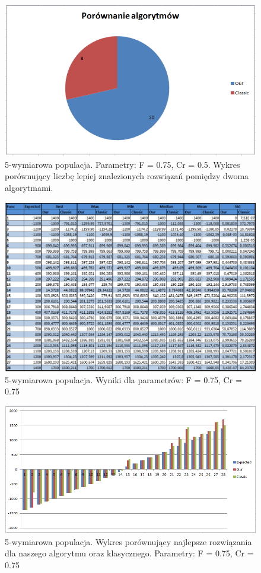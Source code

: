 \documentclass[a4paper]{article}
\begin{document}
\begin{figure}[!h]
\centering
\includegraphics[width=\textwidth]{F75Cr5L5statystyka.png}
\caption{5-wymiarowa populacja. Parametry: F = 0.75, Cr = 0.5. Wykres porównujący liczbę lepiej znalezionych rozwiązań pomiędzy dwoma algorytmami.}
\end{figure}

\begin{figure}[!h]
\centering
\includegraphics[width=\textwidth]{F75Cr75L5tab.png}
\caption{5-wymiarowa populacja. Wyniki dla parametrów: F = 0.75, Cr = 0.75}
\end{figure}

\begin{figure}[!h]
\centering
\includegraphics[width=\textwidth]{F75Cr75L5chart.png}
\caption{5-wymiarowa populacja. Wykres porównujący najlepsze rozwiązania dla naszego algorytmu oraz klasycznego. Parametry: F = 0.75, Cr = 0.75}
\end{figure}
\end{document}
